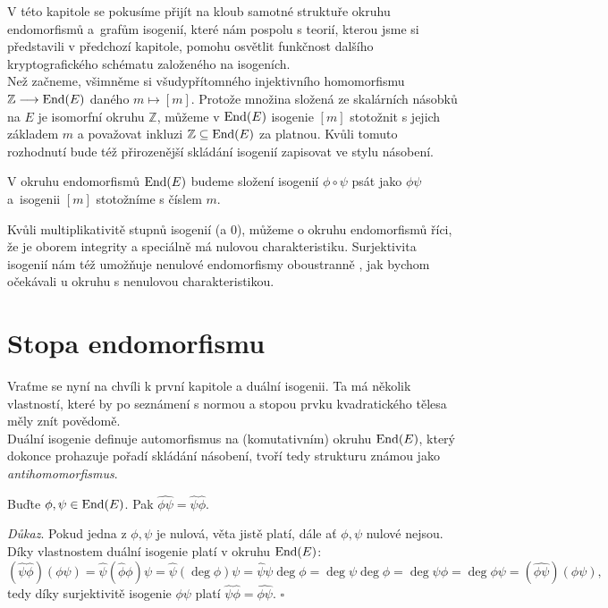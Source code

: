 \documentclass[12pt]{report}
\begin{document}
V této kapitole se pokusíme přijít na kloub samotné struktuře okruhu endomorfismů a~grafům isogenií, které nám pospolu s teorií, kterou jsme si představili v předchozí kapitole, pomohu osvětlit funkčnost dalšího kryptografického schématu založeného na isogeních.\\

Než začneme, všimněme si všudypřítomného injektivního homomorfismu $\mathbb{Z} \longrightarrow \operatorname{End}(E)$ daného $m \mapsto [m]$. Protože množina složená ze skalárních násobků na $E$ je isomorfní okruhu $\mathbb{Z}$, můžeme v $\operatorname{End}(E)$ isogenie $[m]$ stotožnit s jejich základem $m$ a považovat inkluzi $\mathbb{Z} \subseteq \operatorname{End}(E)$ za platnou. Kvůli tomuto rozhodnutí bude též přirozenější skládání isogenií zapisovat ve stylu násobení.

\begin{umluva}
V okruhu endomorfismů $\operatorname{End}(E)$ budeme složení isogenií $\phi \circ \psi$ psát jako $\phi \psi$ a~isogenii $[m]$ stotožníme s číslem $m$.
\end{umluva}


Kvůli multiplikativitě stupnů isogenií (a $0$), můžeme o okruhu endomorfismů říci, že je oborem integrity a speciálně má nulovou charakteristiku. Surjektivita isogenií nám též umožňuje nenulové endomorfismy oboustranně , jak bychom očekávali u okruhu s nenulovou charakteristikou.\\

\section{Stopa endomorfismu}

Vraťme se nyní na chvíli k první kapitole a duální isogenii. Ta má několik vlastností, které by po seznámení s normou a stopou prvku kvadratického tělesa měly znít povědomě.\\

Duální isogenie definuje automorfismus na (komutativním) okruhu $\operatorname{End}(E)$, který dokonce prohazuje pořadí skládání násobení, tvoří tedy strukturu známou jako \textit{antihomomorfismus}. 

\begin{veta}\label{antiho}
Buďte $\phi, \psi \in \operatorname{End}(E)$. Pak $\widehat{\phi \psi} = \widehat{\psi} \widehat{\phi}$. 
\end{veta}
\noindent \textit{Důkaz}. Pokud jedna z $\phi,\psi$ je nulová, věta jistě platí, dále ať $\phi,\psi$ nulové nejsou. Díky vlastnostem duální isogenie platí v okruhu $\operatorname{End}(E)$:
\begin{equation*}
(\widehat{\psi} \widehat{\phi}) (\phi \psi)  = \widehat{\psi} (\widehat{\phi} \phi) \psi = \widehat{\psi}  (\deg \phi) \psi = \widehat{\psi} \psi \deg \phi = \deg \psi \deg \phi = \deg \psi \phi = \deg \phi \psi = (\widehat{\phi \psi})( \phi \psi),
\end{equation*}
tedy díky surjektivitě isogenie $\phi \psi$ platí $\widehat{\psi} \widehat{\phi} = \widehat{\phi \psi}$. \hfill $\square$\\
\end{document}
